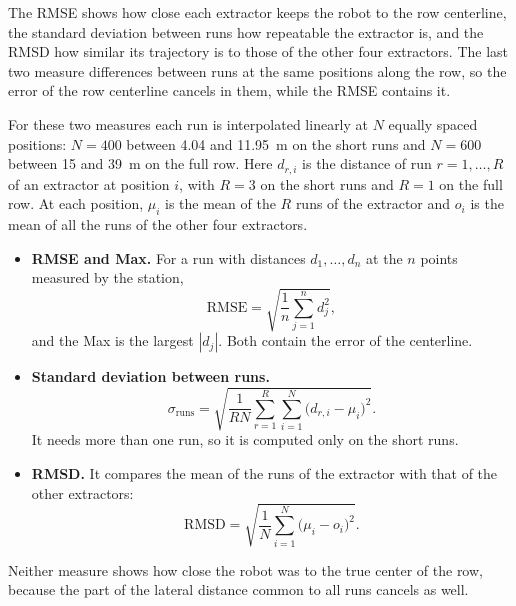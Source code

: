 The RMSE shows how close each extractor keeps the robot to the row centerline, the standard deviation between runs how repeatable the extractor is, and the RMSD how similar its trajectory is to those of the other four extractors. The last two measure differences between runs at the same positions along the row, so the error of the row centerline cancels in them, while the RMSE contains it.

For these two measures each run is interpolated linearly at $N$ equally spaced positions: $N=400$ between 4.04 and 11.95~m on the short runs and $N=600$ between 15 and 39~m on the full row. Here $d_{r,i}$ is the distance of run $r=1,\dots,R$ of an extractor at position $i$, with $R=3$ on the short runs and $R=1$ on the full row. At each position, $\mu_i$ is the mean of the $R$ runs of the extractor and $o_i$ is the mean of all the runs of the other four extractors.
\begin{itemize}
    \item \textbf{RMSE and Max.} For a run with distances $d_1,\dots,d_n$ at the $n$ points measured by the station,
    \begin{equation}
        \mathrm{RMSE}=\sqrt{\frac{1}{n}\sum_{j=1}^{n}d_j^2},
        \label{eq:c7_rmse}
    \end{equation}
    and the Max is the largest $|d_j|$. Both contain the error of the centerline.
    \item \textbf{Standard deviation between runs.}
    \begin{equation}
        \sigma_{\mathrm{runs}}=\sqrt{\frac{1}{RN}\sum_{r=1}^{R}\sum_{i=1}^{N}\bigl(d_{r,i}-\mu_i\bigr)^2}.
        \label{eq:c7_runs}
    \end{equation}
    It needs more than one run, so it is computed only on the short runs.
    \item \textbf{RMSD.} It compares the mean of the runs of the extractor with that of the other extractors:
    \begin{equation}
        \mathrm{RMSD}=\sqrt{\frac{1}{N}\sum_{i=1}^{N}\bigl(\mu_i-o_i\bigr)^2}.
        \label{eq:c7_rmsd}
    \end{equation}
\end{itemize}
Neither measure shows how close the robot was to the true center of the row, because the part of the lateral distance common to all runs cancels as well.

